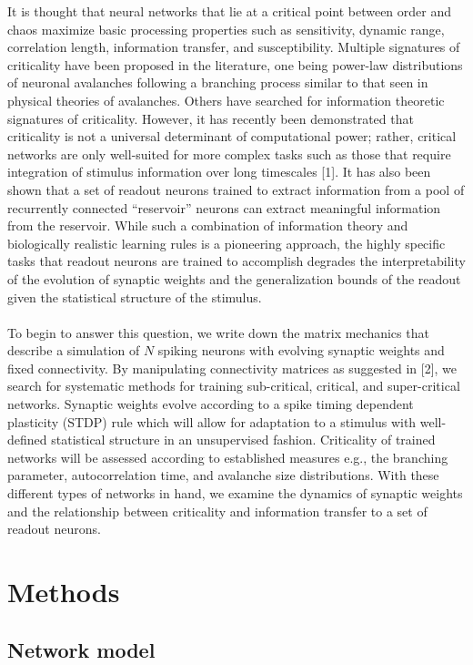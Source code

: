 \documentclass{article} %
\begin{document}
It is thought that neural networks that lie at a critical point between order and chaos maximize basic processing properties such as sensitivity, dynamic range, correlation length, information transfer, and susceptibility. Multiple signatures of criticality have been proposed in the literature, one being power-law distributions of neuronal avalanches following a branching process similar to that seen in physical theories of avalanches. Others have searched for information theoretic signatures of criticality. 
However, it has recently been demonstrated that criticality is not a universal determinant of computational power; rather, critical networks are only well-suited for more complex tasks such as those that require integration of stimulus information over long timescales [1]. It has also been shown that a set of readout neurons trained to extract information from a pool of recurrently connected “reservoir” neurons can extract meaningful information from the reservoir. While such a combination of information theory and biologically realistic learning rules is a pioneering approach, the highly specific tasks that readout neurons are trained to accomplish degrades the interpretability of the evolution of synaptic weights and the generalization bounds of the readout given the statistical structure of the stimulus. 
\\
\\
To begin to answer this question, we write down the matrix mechanics that describe a simulation of $N$ spiking neurons with evolving synaptic weights and fixed connectivity. By manipulating connectivity matrices as suggested in [2], we search for systematic methods for training sub-critical, critical, and super-critical networks. Synaptic weights evolve according to a spike timing dependent plasticity (STDP) rule which will allow for adaptation to a stimulus with well-defined statistical structure in an unsupervised fashion. Criticality of trained networks will be assessed according to established measures e.g., the branching parameter, autocorrelation time, and avalanche size distributions. With these different types of networks in hand, we examine the dynamics of synaptic weights and the relationship between criticality and information transfer to a set of readout neurons. 

\section{Methods}


\subsection{Network model}
\end{document}

